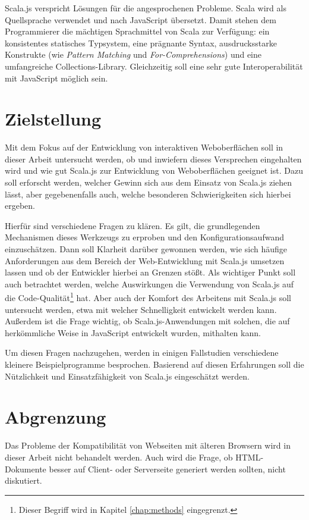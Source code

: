 \documentclass[a4paper, 12pt, hidelinks, listof=totoc, listoftables=totoc, bibliography=totoc]{scrreprt}
\begin{document}
Scala.js verspricht Lösungen für die angesprochenen Probleme. Scala wird als Quellsprache verwendet und nach JavaScript übersetzt. Damit stehen dem Programmierer die mächtigen Sprachmittel von Scala zur Verfügung: ein konsistentes statisches Typsystem, eine prägnante Syntax, ausdrucksstarke Konstrukte (wie \emph{Pattern Matching} und \emph{For-Comprehensions}) und eine umfangreiche Collections-Library. Gleichzeitig soll eine sehr gute Interoperabilität mit JavaScript möglich sein.


\section{Zielstellung}

Mit dem Fokus auf der Entwicklung von interaktiven Weboberflächen soll in dieser Arbeit untersucht werden, ob und inwiefern dieses Versprechen eingehalten wird und wie gut Scala.js zur Entwicklung von Weboberflächen geeignet ist. Dazu soll erforscht werden, welcher Gewinn sich aus dem Einsatz von Scala.js ziehen lässt, aber gegebenenfalls auch, welche besonderen Schwierigkeiten sich hierbei ergeben.

Hierfür sind verschiedene Fragen zu klären. Es gilt, die grundlegenden Mechanismen dieses Werkzeugs zu erproben und den Konfigurationsaufwand einzuschätzen. Dann soll Klarheit darüber gewonnen werden, wie sich häufige Anforderungen aus dem Bereich der Web-Entwicklung mit Scala.js umsetzen lassen und ob der Entwickler hierbei an Grenzen stößt. Als wichtiger Punkt soll auch betrachtet werden, welche Auswirkungen die Verwendung von Scala.js auf die Code-Qualität\footnote{Dieser Begriff wird in Kapitel \ref{chap:methods} eingegrenzt.} hat. Aber auch der Komfort des Arbeitens mit Scala.js soll untersucht werden, etwa mit welcher Schnelligkeit entwickelt werden kann. Außerdem ist die Frage wichtig, ob Scala.js-Anwendungen mit solchen, die auf herkömmliche Weise in JavaScript entwickelt wurden, mithalten kann.

Um diesen Fragen nachzugehen, werden in einigen Fallstudien verschiedene kleinere Beispielprogramme besprochen. Basierend auf diesen Erfahrungen soll die Nützlichkeit und Einsatzfähigkeit von Scala.js eingeschätzt werden.


\section{Abgrenzung}

Das Probleme der Kompatibilität von Webseiten mit älteren Browsern wird in dieser Arbeit nicht behandelt werden. Auch wird die Frage, ob \ac{HTML}-Dokumente besser auf Client- oder Serverseite generiert werden sollten, nicht diskutiert.
\end{document}
